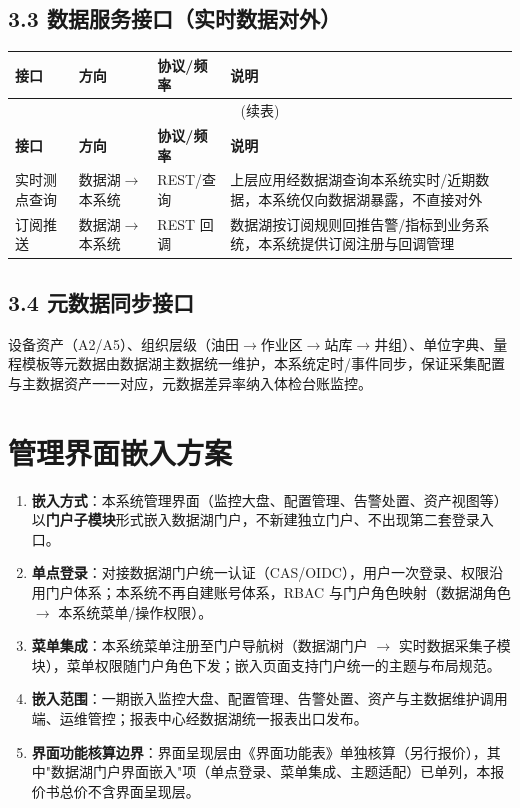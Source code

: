 \documentclass[11pt,a4paper]{ctexart}
\begin{document}
\subsection{3.3 数据服务接口（实时数据对外）}

\begin{longtable}{p{3.6cm} p{3.2cm} p{1.9cm} p{3.4cm}}
\toprule
\textbf{接口} & \textbf{方向} & \textbf{协议/频率} & \textbf{说明} \\
\midrule
\endfirsthead
\multicolumn{4}{c}{(续表)} \\
\toprule
\textbf{接口} & \textbf{方向} & \textbf{协议/频率} & \textbf{说明} \\
\midrule
\endhead
实时测点查询 & 数据湖$\rightarrow$本系统 & REST/查询 & 上层应用经数据湖查询本系统实时/近期数据，本系统仅向数据湖暴露，不直接对外 \\
订阅推送 & 数据湖$\rightarrow$本系统 & REST 回调 & 数据湖按订阅规则回推告警/指标到业务系统，本系统提供订阅注册与回调管理 \\
\bottomrule
\end{longtable}

\subsection{3.4 元数据同步接口}

设备资产（A2/A5）、组织层级（油田$\rightarrow$作业区$\rightarrow$站库$\rightarrow$井组）、单位字典、量程模板等元数据由数据湖主数据统一维护，本系统定时/事件同步，保证采集配置与主数据资产一一对应，元数据差异率纳入体检台账监控。

\section{管理界面嵌入方案}

\begin{enumerate}[leftmargin=*]
  \item \textbf{嵌入方式}：本系统管理界面（监控大盘、配置管理、告警处置、资产视图等）以\textbf{门户子模块}形式嵌入数据湖门户，不新建独立门户、不出现第二套登录入口。
  \item \textbf{单点登录}：对接数据湖门户统一认证（CAS/OIDC），用户一次登录、权限沿用门户体系；本系统不再自建账号体系，RBAC 与门户角色映射（数据湖角色 $\rightarrow$ 本系统菜单/操作权限）。
  \item \textbf{菜单集成}：本系统菜单注册至门户导航树（数据湖门户 $\rightarrow$ 实时数据采集子模块），菜单权限随门户角色下发；嵌入页面支持门户统一的主题与布局规范。
  \item \textbf{嵌入范围}：一期嵌入监控大盘、配置管理、告警处置、资产与主数据维护调用端、运维管控；报表中心经数据湖统一报表出口发布。
  \item \textbf{界面功能核算边界}：界面呈现层由《界面功能表》单独核算（另行报价），其中"数据湖门户界面嵌入"项（单点登录、菜单集成、主题适配）已单列，本报价书总价不含界面呈现层。
\end{enumerate}
\end{document}
